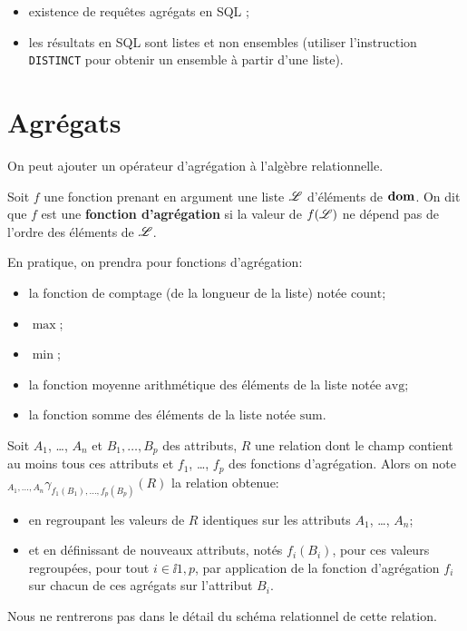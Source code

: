 \begin{itemize}
\item existence de requêtes agrégats en SQL ;
\item les résultats en SQL sont listes et non ensembles (utiliser l'instruction \texttt{DISTINCT} pour obtenir un ensemble à partir d'une liste).
\end{itemize}

\section{Agrégats}

On peut ajouter un opérateur d'agrégation à l'algèbre relationnelle.


\begin{defi}
  Soit $f$ une fonction prenant en argument une liste $\mathscr{L}$ d'éléments
  de $\mathbf{dom}$. On dit que $f$ est une \textbf{fonction d'agrégation} si la
  valeur de $f(\mathscr{L})$ ne dépend pas de l'ordre des éléments de $\mathscr{L}$.
\end{defi}
En pratique, on prendra pour fonctions d'agrégation:
\begin{itemize}
\item la fonction de comptage (de la longueur de la liste) notée $\mathrm{count}$;
\item $\max$;
\item $\min$;
\item la fonction moyenne arithmétique des éléments de la liste notée $\mathrm{avg}$;
\item la fonction somme des éléments de la liste notée $\mathrm{sum}$.
\end{itemize}
\begin{defi}
  Soit $A_{1}$, \ldots{}, $A_{n}$ et $B_{1}, \ldots,B_{p}$ des
  attributs, $R$ une relation dont le champ contient au moins tous
  ces attributs et $f_{1}$, \ldots{}, $f_{p}$ des fonctions d'agrégation.
  Alors on note
  ${}_{A_{1},\ldots,A_{n}}\gamma_{f_1(B_{1}),\ldots,f_p(B_{p})}(R)$ la relation
  obtenue:
  \begin{itemize}
  \item en regroupant les valeurs de $R$ identiques sur les attributs
    $A_{1}$, \ldots{}, $A_{n}$;
  \item et en définissant de nouveaux attributs, notés $f_{i}(B_{i})$,
    pour ces valeurs regroupées, pour tout $i\in\ii{1,p}$, par
    application de la fonction d'agrégation $f_{i}$ sur chacun de ces
    agrégats sur l'attribut $B_{i}$.
  \end{itemize}
\end{defi}
\begin{rem}
  Nous ne rentrerons pas dans le détail du schéma relationnel de cette relation. 
\end{rem}

